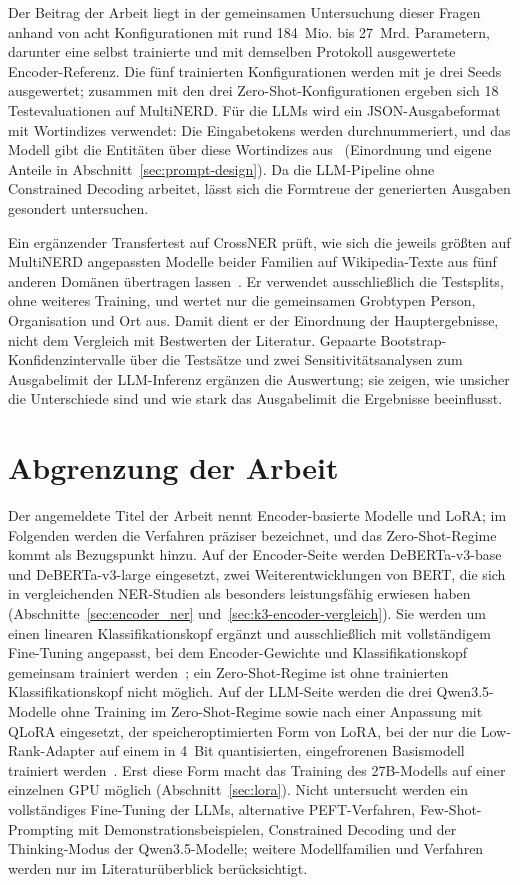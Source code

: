 Der Beitrag der Arbeit liegt in der gemeinsamen Untersuchung dieser
Fragen anhand von acht Konfigurationen mit rund 184~Mio. bis 27~Mrd.
Parametern, darunter eine selbst trainierte und mit demselben Protokoll
ausgewertete Encoder-Referenz.
Die fünf trainierten Konfigurationen werden mit je drei Seeds
ausgewertet; zusammen mit den drei Zero-Shot-Konfigurationen ergeben sich
18 Testevaluationen auf MultiNERD.
Für die LLMs wird ein JSON-Ausgabeformat mit Wortindizes verwendet:
Die Eingabetokens werden durchnummeriert, und das Modell gibt die
Entitäten über diese Wortindizes aus~\cite[Tab.~9]{ramponi2025fallacy}
(Einordnung und eigene Anteile in Abschnitt~\ref{sec:prompt-design}).
Da die LLM-Pipeline ohne Constrained Decoding arbeitet, lässt sich die
Formtreue der generierten Ausgaben gesondert untersuchen.

Ein ergänzender Transfertest auf CrossNER prüft, wie sich die jeweils
größten auf MultiNERD angepassten Modelle beider Familien auf
Wikipedia-Texte aus fünf anderen Domänen übertragen
lassen~\cite{liu2021crossner}.
Er verwendet ausschließlich die Testsplits, ohne weiteres Training, und
wertet nur die gemeinsamen Grobtypen Person, Organisation und Ort aus.
Damit dient er der Einordnung der Hauptergebnisse, nicht dem Vergleich
mit Bestwerten der Literatur.
Gepaarte Bootstrap-Konfidenzintervalle über die Testsätze und zwei
Sensitivitätsanalysen zum Ausgabelimit der LLM-Inferenz ergänzen die
Auswertung; sie zeigen, wie unsicher die Unterschiede sind und wie stark
das Ausgabelimit die Ergebnisse beeinflusst.

\section{Abgrenzung der Arbeit}
\label{sec:abgrenzung}

Der angemeldete Titel der Arbeit nennt Encoder-basierte Modelle und LoRA;
im Folgenden werden die Verfahren präziser bezeichnet,
und das Zero-Shot-Regime kommt als Bezugspunkt hinzu.
Auf der Encoder-Seite werden DeBERTa-v3-base und DeBERTa-v3-large
eingesetzt, zwei Weiterentwicklungen von BERT, die sich in vergleichenden
NER-Studien als besonders leistungsfähig erwiesen
haben~\cite{keraghel2024recent} (Abschnitte~\ref{sec:encoder_ner}
und~\ref{sec:k3-encoder-vergleich}).
Sie werden um einen linearen Klassifikationskopf ergänzt und
ausschließlich mit vollständigem Fine-Tuning angepasst, bei dem
Encoder-Gewichte und Klassifikationskopf gemeinsam trainiert
werden~\cite{devlin2019bert}; ein Zero-Shot-Regime ist ohne trainierten
Klassifikationskopf nicht möglich.
Auf der LLM-Seite werden die drei Qwen3.5-Modelle ohne Training im
Zero-Shot-Regime sowie nach einer Anpassung
mit QLoRA eingesetzt, der speicheroptimierten Form von LoRA, bei der nur
die Low-Rank-Adapter auf einem in 4~Bit quantisierten, eingefrorenen
Basismodell trainiert werden~\cite{hu2021lora,dettmers2023qlora}.
Erst diese Form macht das Training des 27B-Modells auf einer einzelnen
GPU möglich (Abschnitt~\ref{sec:lora}).
Nicht untersucht werden ein vollständiges Fine-Tuning der LLMs,
alternative PEFT-Verfahren, Few-Shot-Prompting mit
Demonstrationsbeispielen, Constrained Decoding und der Thinking-Modus
der Qwen3.5-Modelle; weitere Modellfamilien und Verfahren werden nur im
Literaturüberblick berücksichtigt.

